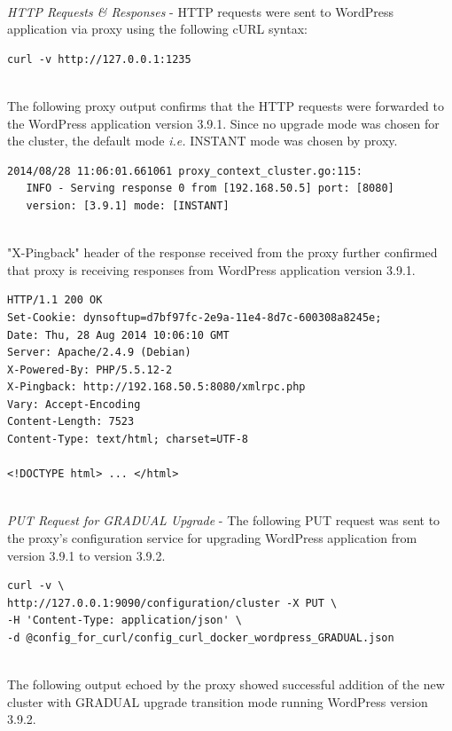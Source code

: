 \documentclass[a4paper,11pt,twoside]{report}
\begin{document}
\noindent\\
\textit{HTTP Requests \& Responses} - HTTP requests were sent to WordPress application via proxy using the following cURL syntax:\smallskip

\begin{lstlisting}[language=terminal]
curl -v http://127.0.0.1:1235
\end{lstlisting}

\noindent\\
The following proxy output confirms that the HTTP requests were forwarded to the WordPress application version 3.9.1. Since no upgrade mode was chosen for the cluster, the default mode \textit{i.e.} INSTANT mode was chosen by proxy. \smallskip

\begin{lstlisting}[language=terminal]
2014/08/28 11:06:01.661061 proxy_context_cluster.go:115:     
   INFO - Serving response 0 from [192.168.50.5] port: [8080] 
   version: [3.9.1] mode: [INSTANT]
\end{lstlisting}

\noindent\\
"X-Pingback" header of the response received from the proxy further confirmed that proxy is receiving responses from WordPress application version 3.9.1.\smallskip 

\begin{lstlisting}[language=terminal]
HTTP/1.1 200 OK
Set-Cookie: dynsoftup=d7bf97fc-2e9a-11e4-8d7c-600308a8245e;
Date: Thu, 28 Aug 2014 10:06:10 GMT
Server: Apache/2.4.9 (Debian)
X-Powered-By: PHP/5.5.12-2
X-Pingback: http://192.168.50.5:8080/xmlrpc.php
Vary: Accept-Encoding
Content-Length: 7523
Content-Type: text/html; charset=UTF-8
 
<!DOCTYPE html> ... </html>
\end{lstlisting}

\noindent\\
\textit{PUT Request for GRADUAL Upgrade} - The following PUT request was sent to the proxy's configuration service for upgrading WordPress application from version 3.9.1 to version 3.9.2.\smallskip

\begin{lstlisting}[language=terminal]
curl -v \
http://127.0.0.1:9090/configuration/cluster -X PUT \
-H 'Content-Type: application/json' \ 
-d @config_for_curl/config_curl_docker_wordpress_GRADUAL.json
\end{lstlisting}
 
\noindent \\
The following output echoed by the proxy showed successful addition of the new cluster with GRADUAL upgrade transition mode running WordPress version 3.9.2. \smallskip
\end{document}
